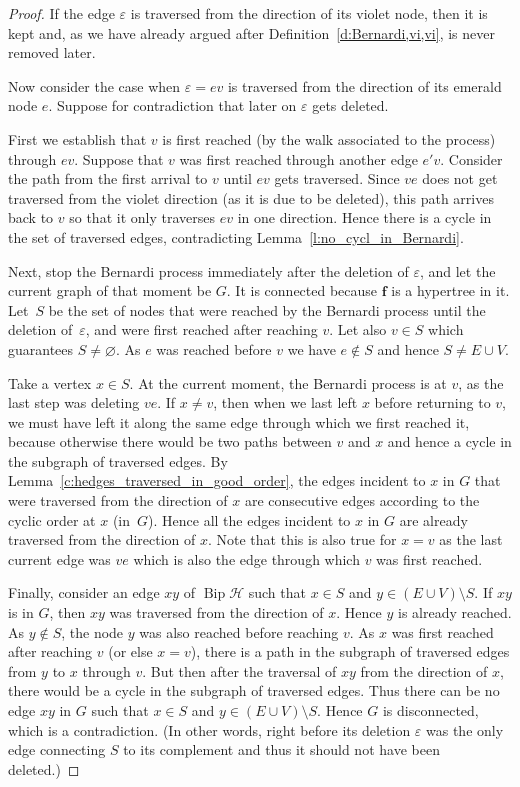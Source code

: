 \documentclass[10pt]{amsart}
\theoremstyle{definition}\newtheorem{defi}[theo]{Definition}
\theoremstyle{remark}\newtheorem{rema}[theo]{Remark}
\newcommand{\HH}{\mathcal H}
\DeclareMathOperator{\bip}{Bip}
\begin{document}
\begin{proof}
If the edge $\varepsilon$ is traversed from the direction of its violet node, then it is kept and, as we have already argued after Definition~\ref{d:Bernardi,vi,vi}, is never removed later.
	
Now consider the case when $\varepsilon=ev$ is traversed from the direction of its emerald node $e$. Suppose for contradiction that later on $\varepsilon$ gets deleted. 

First we establish that $v$ is first reached (by the walk associated to the process) through $ev$. Suppose that $v$ was first reached through another edge $e'v$. Consider the path from the first arrival to $v$ until $ev$ gets traversed. Since $ve$ does not get traversed from the violet direction (as it is due to be deleted), this path arrives back to $v$ so that it only traverses $ev$ in one direction. Hence there is a cycle in the set of traversed edges, contradicting Lemma~\ref{l:no_cycl_in_Bernardi}.

Next, stop the Bernardi process immediately after the deletion of $\varepsilon$, and let the current graph of that moment be $G$. It is connected because $\mathbf f$ is a hypertree in it. Let~$S$ be the set of nodes that were reached by the Bernardi process until the deletion of~$\varepsilon$, and were first reached after reaching $v$. Let also $v\in S$ which guarantees $S\ne\varnothing$. As $e$ was reached before $v$ we have $e\notin S$ and hence $S\ne E\cup V$.

Take a vertex $x\in S$. At the current moment, the Bernardi process is at $v$, as the last step was deleting $ve$. If $x\neq v$, then when we last left $x$ before returning to $v$, we must have left it along the same edge through which we first reached it, because otherwise there would be two paths between $v$ and $x$ and hence a cycle in the subgraph of traversed edges. By Lemma~\ref{c:hedges_traversed_in_good_order}, the edges incident to $x$ in $G$ that were traversed from the direction of $x$ are consecutive edges according to the cyclic order at $x$ (in~$G$). Hence all the edges incident to $x$ in $G$ are already traversed from the direction of $x$. Note that this is also true for $x=v$ as the last current edge was $ve$ which is also the edge through which $v$ was first reached.

Finally, consider an edge $xy$ of $\bip \HH$ such that $x\in S$ and $y\in (E\cup V) \setminus S$. If $xy$ is in $G$, then $xy$ was traversed from the direction of $x$. Hence $y$ is already reached. As $y\notin S$, the node $y$ was also reached before reaching $v$. As $x$ was first reached after reaching $v$ (or else $x=v$), there is a path in the subgraph of traversed edges from $y$ to $x$ through $v$. But then after the traversal of $xy$ from the direction of $x$, there would be a cycle in the subgraph of traversed edges. Thus there can be no edge $xy$ in $G$ such that $x\in S$ and $y\in (E\cup V) \setminus S$. Hence $G$ is disconnected, which is a contradiction. (In other words, right before its deletion $\varepsilon$ was the only edge connecting $S$ to its complement and thus it should not have been deleted.)
\end{proof}
\end{document}
